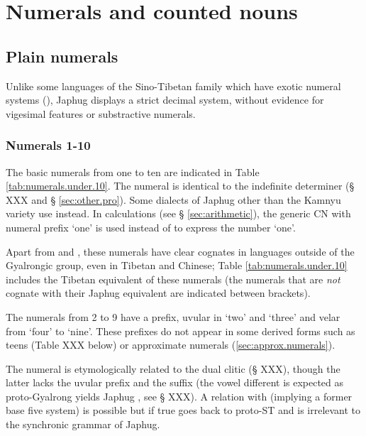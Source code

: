 \chapter{Numerals and counted nouns}

\section{Plain numerals} \label{sec:plain.numerals}
Unlike some languages of the Sino-Tibetan family which have exotic numeral systems (\citealt{mazaudon02nombre}), Japhug displays a strict decimal system, without evidence for vigesimal features or substractive numerals.


\subsection{Numerals 1-10}  \label{sec:one.to.ten}
The basic numerals from one to ten are indicated in Table \ref{tab:numerals.under.10}. The numeral  is identical to the indefinite determiner (§ XXX and § \ref{sec:other.pro}). Some dialects of Japhug other than the Kamnyu variety use  instead. In calculations (see § \ref{sec:arithmetic}), the generic CN with numeral prefix `one'  is used instead of  to express the number `one'.

Apart from  and , these numerals have clear cognates in languages outside of the Gyalrongic group, even in Tibetan and Chinese; Table \ref{tab:numerals.under.10} includes the Tibetan equivalent of these numerals (the numerals that are \textit{not} cognate with their Japhug equivalent are indicated between brackets).

The numerals from 2 to 9 have a prefix, uvular  in `two' and `three' and velar  from `four' to `nine'. These prefixes do not appear in some derived forms such as teens (Table XXX below) or approximate numerals (\ref{sec:approx.numerals}).

The numeral  is etymologically related to the dual clitic  (§ XXX), though the latter lacks the uvular prefix and the  suffix (the vowel different is expected as proto-Gyalrong  yields Japhug , see § XXX). A relation with  (implying a former base five system) is possible but if true goes back to proto-ST and is irrelevant to the synchronic grammar of Japhug.

